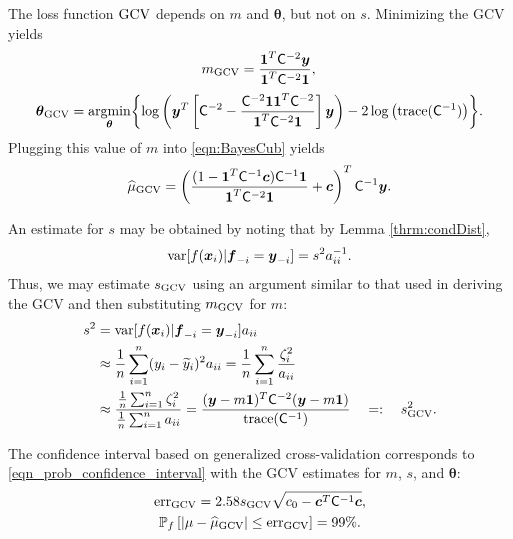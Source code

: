 \documentclass{iitthesis}          %
\newcommand{\bm}[1]{\boldsymbol{#1}}
\newcommand{\trace}[1]{\textup{trace}{#1}}
\newcommand{\vtheta}{{\bm{\theta}}}
\newcommand{\vc}{\bm{c}}
\newcommand{\vf}{\bm{f}}
\newcommand{\vx}{\bm{x}}
\newcommand{\vy}{\bm{y}}
\newcommand{\vone}{\bm{1}}
\newcommand{\mC}{\mathsf{C}}
\newcommand{\var}{{\textup{var}}}
\newcommand{\hmu}{\widehat{\mu}}
\newcommand{\GCV}{\textup{GCV}}
\newcommand{\err}{\textup{err}}
\providecommand{\argmin}{\operatorname*{argmin}}
\begin{document}
The loss function $\textup{GCV}$ depends on $m$ and $\vtheta$, but not on $s$.  Minimizing the GCV  yields
\begin{equation*}
m_{\textup{GCV}} = \frac{\vone^T \mC^{-2} \vy}{\vone^T \mC^{-2} \vone},\\ 
\end{equation*}
\begin{align*}
\vtheta_{\textup{GCV}} = \argmin_\vtheta \biggl\{\log \left(  \vy^T \left[\mC^{-2} - \frac{\mC^{-2} \vone \vone^T \mC^{-2}}{\vone^T \mC^{-2} \vone}  \right] \vy \right)  
- 2 \log \left ( \trace(\mC^{-1}) \right ) \biggr\} .
\end{align*}
Plugging this value of $m$ into \eqref{eqn:BayesCub} yields
\begin{equation*}
\widehat{\mu}_{\textup{GCV}}
= \left(\frac{(1 - \vone^T  \mC^{-1}\vc) \mC^{-1} \vone}{\vone^T \mC^{-2} \vone} + \vc \right)^T \mC^{-1} \vy.
\end{equation*}

An estimate for $s$ may be obtained by noting that by Lemma \ref{thrm:condDist},
\begin{align*}
\var[f(\vx_i ) | \vf_{-i} = \vy_{-i}] = s^2 a_{ii}^{-1}.
\end{align*}
Thus, we may estimate $s_\GCV$ using an argument similar to that used in deriving the GCV and then substituting $m_{\textup{GCV}}$ for $m$:
\begin{align*}
s^2 &= \var[f(\vx_i ) | \vf_{-i} = \vy_{-i}] a_{ii} \\ 
& \approx \frac 1n \sum_{i=1}^n (y_i - \widetilde{y}_i)^2a_{ii}  = \frac 1n \sum_{i=1}^n \frac{\zeta_i^2}{a_{ii}} \\ 
& \approx \frac{ \frac 1n \sum_{i=1}^n \zeta_i^2}{\frac 1n \sum_{i=1}^n a_{ii} } 
 = \frac{(\vy - m\vone)^T \mC^{-2} (\vy - m \vone)}{ \trace(\mC^{-1}) } \quad =: \quad s^2_{\textup{GCV}}. \\
\end{align*}

The confidence interval based on generalized cross-validation corresponds to \eqref{eqn_prob_confidence_interval} with the GCV estimates for $m$, $s$, and $\vtheta$:
\begin{gather}
\label{GCVerr}
\err_{\textup{GCV}} = 2.58 s_{\textup{GCV}}  \sqrt{c_0 - \vc^T\mC^{-1}\vc}, \\
\label{GCVCI}
\mathbb{P}_f \left[
|\mu-\hmu_{\textup{GCV}}| \leq \err_{\textup{GCV}} 
\right] = 99\%.
\end{gather}
\end{document}
